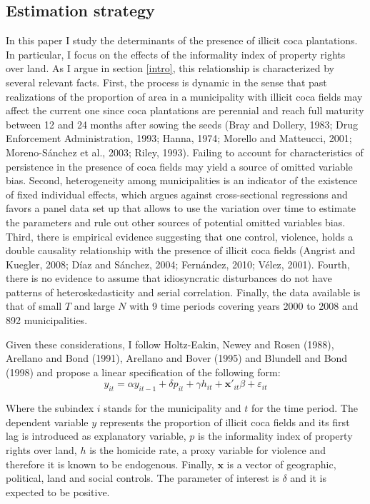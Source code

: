 \documentclass[a4paper, 12pt]{article}
\begin{document}
\subsection{Estimation strategy}
\label{strategy}

In this paper I study the determinants of the presence of illicit coca plantations. In particular, I focus on the effects of the informality index of property rights over land. As I argue in section \ref{intro}, this relationship is characterized by several relevant facts. First, the process is dynamic in the sense that past realizations of the proportion of area in a municipality with illicit coca fields may affect the current one since coca plantations are perennial and reach full maturity between 12 and 24 months after sowing the seeds (Bray and Dollery, 1983; Drug Enforcement Administration, 1993; Hanna, 1974; Morello and Matteucci, 2001; Moreno-S\'{a}nchez et al., 2003; Riley, 1993). Failing to account for characteristics of persistence in the presence of coca fields may yield a source of omitted variable bias. Second, heterogeneity among municipalities is an indicator of the existence of fixed individual effects, which argues against cross-sectional regressions and favors a panel data set up that allows to use the variation over time to estimate the parameters and rule out other sources of potential omitted variables bias. Third, there is empirical evidence suggesting that one control, violence, holds a double causality relationship with the presence of illicit coca fields (Angrist and Kuegler, 2008; D\'{i}az and S\'{a}nchez, 2004; Fern\'{a}ndez, 2010; V\'{e}lez, 2001). Fourth, there is no evidence to assume that idiosyncratic disturbances do not have patterns of heteroskedasticity and serial correlation. Finally, the data available is that of small $T$ and large $N$ with 9 time periods covering years 2000 to 2008 and 892 municipalities.

Given these considerations, I follow Holtz-Eakin, Newey and Rosen (1988), Arellano and Bond (1991), Arellano and Bover (1995) and Blundell and Bond (1998) and propose a linear specification of the following form:
\begin{equation}
\label{model}
y_{it}=\alpha y_{it-1}+\delta p_{it} + \gamma h_{it} + \mathbf{x'}_{it}\beta + \varepsilon_{it}
\end{equation}

Where the subindex $i$ stands for the municipality and $t$ for the time period. The dependent variable $y$ represents the proportion of illicit coca fields and its first lag is introduced as explanatory variable, $p$ is the informality index of property rights over land, $h$ is the homicide rate, a proxy variable for violence and therefore it is known to be endogenous. Finally, $\mathbf{x}$ is a vector of geographic, political, land and social controls. The parameter of interest is $\delta$ and it is expected to be positive.
\end{document}
